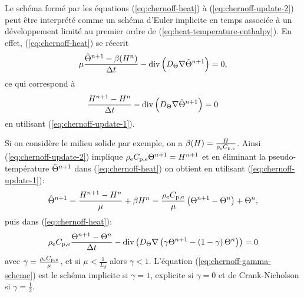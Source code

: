 \begin{remarque}
  Le schéma formé par les équations (\ref{eq:chernoff-heat}) à
  (\ref{eq:chernoff-update-2}) peut être interprété comme un
  schéma d'Euler implicite en temps associée à un développement
  limité au premier ordre de (\ref{eq:heat-temperature-enthalpy}). En
  effet, (\ref{eq:chernoff-heat}) se réecrit
  \begin{equation}
    \mu \frac{\hat{\Theta}^{n+1} - \beta(H^n)}{\Delta t} -
    \mathrm{div}\left( D_\Theta \nabla \hat{\Theta}^{n+1} \right) = 0,
  \end{equation}
  ce qui correspond à
  \begin{equation}
    \frac{H^{n+1} - H^n}{\Delta t} -
    \mathrm{div}\left( D_\Theta \nabla \hat{\Theta}^{n+1} \right) = 0
  \end{equation}
  en utilisant (\ref{eq:chernoff-update-1}).
\end{remarque}

\begin{remarque}
Si on considère le milieu solide par exemple, on a
$\beta(H) =
\frac{H}{\rho_\mathrm{e}C_{\mathrm{p,e}}}$. Ainsi
(\ref{eq:chernoff-update-2}) implique
$\rho_\mathrm{e}C_{\mathrm{p,e}}\Theta^{n+1} =
H^{n+1}$ et en éliminant la pseudo-température
$\hat{\Theta}^{n+1}$ dans (\ref{eq:chernoff-heat}) on obtient en
utilisant (\ref{eq:chernoff-update-1}):
\begin{equation}
  \hat{\Theta}^{n+1} = \frac{H^{n+1} -
    H^n}{\mu} + \beta{H^n} =
  \frac{\rho_\mathrm{e}
    C_{\mathrm{p,e}}}{\mu}\left( \Theta^{n+1} - \Theta^{n} \right)
  + \Theta^{n},
\end{equation}
puis dans (\ref{eq:chernoff-heat}):
\begin{equation}
\rho_\mathrm{e} C_{\mathrm{p,e}} \frac{\Theta^{n+1} -
  \Theta^{n}}{\Delta t} - \mathrm{div}\left( D_\Theta
  \nabla\left( \gamma \Theta^{n+1} - \left( 1 -
      \gamma \right)\Theta^n \right) \right) = 0 \label{eq:chernoff-gamma-scheme}
\end{equation}
avec $\gamma = \frac{\rho_\mathrm{e} C_{\mathrm{p,e}}}{\mu}$, et si
$\mu < \frac{1}{L_\beta}$ alors $\gamma < 1$.
L'équation (\ref{eq:chernoff-gamma-scheme}) est le schéma implicite
si $\gamma = 1$, explicite si $\gamma = 0$ et de Crank-Nicholson si
$\gamma = \frac{1}{2}$.
\end{remarque}

